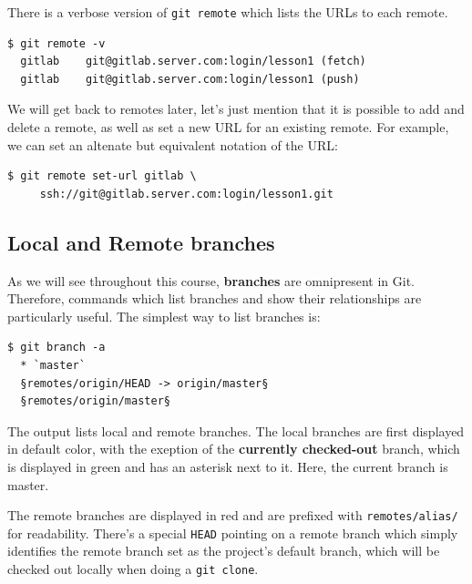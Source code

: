 \documentclass{tufte-handout}
\begin{document}
There is a verbose version of \texttt{git remote} which lists the URLs to each remote.

\begin{lstlisting}[style=BashInputStyle]
  $ git remote -v
  gitlab	git@gitlab.server.com:login/lesson1 (fetch)
  gitlab	git@gitlab.server.com:login/lesson1 (push)
\end{lstlisting}

We will get back to remotes later, let's just mention that it is possible to add and delete a remote, as well as set a new URL for an existing remote.
For example, we can set an altenate but equivalent notation of the URL:


\begin{lstlisting}[style=BashInputStyle]
  $ git remote set-url gitlab \
     ssh://git@gitlab.server.com:login/lesson1.git
\end{lstlisting}

\subsection{Local and Remote branches}

As we will see throughout this course, \textbf{branches} are omnipresent in Git.
Therefore, commands which list branches and show their relationships are particularly useful.
The simplest way to list branches is:


\begin{lstlisting}[style=BashInputStyle]
  $ git branch -a
  * `master`
  §remotes/origin/HEAD -> origin/master§
  §remotes/origin/master§
\end{lstlisting}

The output lists local and remote branches.
The local branches are first displayed in default color, with the exeption of the \textbf{currently checked-out} branch, which is displayed in green and has an asterisk next to it.
Here, the current branch is master.

The remote branches are displayed in red and are prefixed with \texttt{remotes/alias/} for readability.
There's a special \texttt{HEAD} pointing on a remote branch which simply identifies the remote branch set as the project's default branch, which will be checked out locally when doing a \texttt{git clone}.
\end{document}
